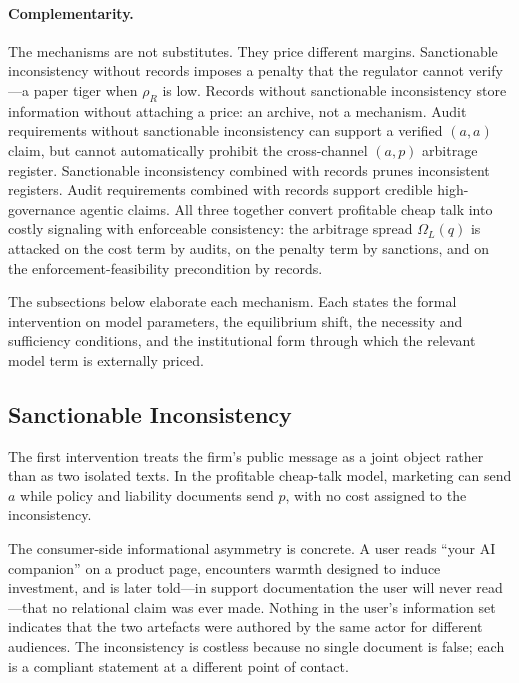 \documentclass[preprint,authoryear]{elsarticle}
\theoremstyle{definition}
\theoremstyle{plain}
\begin{document}
\paragraph{Complementarity.}
The mechanisms are not substitutes.  They price different margins.
Sanctionable inconsistency without records imposes a penalty that the regulator
cannot verify---a paper tiger when $\rho_R$ is low.  Records without
sanctionable inconsistency store information without attaching a price:
an archive, not a mechanism.  Audit requirements without sanctionable
inconsistency can support a verified $(a,a)$ claim, but cannot automatically
prohibit the cross-channel $(a,p)$ arbitrage register.  Sanctionable
inconsistency combined with records prunes inconsistent registers.  Audit
requirements combined with records support credible high-governance agentic
claims.  All three together convert profitable cheap talk into costly signaling
with enforceable consistency: the arbitrage spread $\Omega_L(q)$ is attacked on
the cost term by audits, on the penalty term by sanctions, and on the
enforcement-feasibility precondition by records.

The subsections below elaborate each mechanism.  Each states the formal
intervention on model parameters, the equilibrium shift, the necessity and
sufficiency conditions, and the institutional form through which the relevant
model term is externally priced.

\subsection{Sanctionable Inconsistency}
\label{subsec:sanctionable-inconsistency}

The first intervention treats the firm's public message as a joint object rather
than as two isolated texts. In the profitable cheap-talk model, marketing can send $a$
while policy and liability documents send $p$, with no cost assigned to the
inconsistency.

The consumer-side informational asymmetry is concrete. A user reads ``your AI companion'' on a product page, encounters warmth designed to induce investment, and is later told---in support documentation the user will never read---that no relational claim was ever made. Nothing in the user's information set indicates that the two artefacts were authored by the same actor for different audiences. The inconsistency is costless because no single document is false; each is a compliant statement at a different point of contact.
\end{document}
